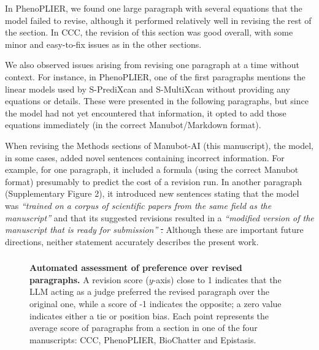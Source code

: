 \documentclass[
]{article}
\providecommand{\DIFaddtex}[1]{{\protect\color{blue}\uwave{#1}}} %
\providecommand{\DIFdeltex}[1]{{\protect\color{red}\sout{#1}}}                      %
\providecommand{\DIFaddbegin}{} %
\providecommand{\DIFaddend}{} %
\providecommand{\DIFdelbegin}{} %
\providecommand{\DIFdelend}{} %
\providecommand{\DIFadd}[1]{\texorpdfstring{\DIFaddtex{#1}}{#1}} %
\providecommand{\DIFdel}[1]{\texorpdfstring{\DIFdeltex{#1}}{}} %
\newcommand{\DIFscaledelfig}{0.5}
\newlength{\DIFdelgraphicswidth} %
\newlength{\DIFdelgraphicsheight} %
\newcommand{\DIFaddincludegraphics}[2][]{{\color{blue}\fbox{\DIFOincludegraphics[#1]{#2}}}} %
\newcommand{\DIFdelincludegraphics}[2][]{%
\sbox{\DIFdelgraphicsbox}{\DIFOincludegraphics[#1]{#2}}%
\settoboxwidth{\DIFdelgraphicswidth}{\DIFdelgraphicsbox} %
\settoboxtotalheight{\DIFdelgraphicsheight}{\DIFdelgraphicsbox} %
\scalebox{\DIFscaledelfig}{%
\parbox[b]{\DIFdelgraphicswidth}{\usebox{\DIFdelgraphicsbox}\\[-\baselineskip] \rule{\DIFdelgraphicswidth}{0em}}\llap{\resizebox{\DIFdelgraphicswidth}{\DIFdelgraphicsheight}{%
\setlength{\unitlength}{\DIFdelgraphicswidth}%
\begin{picture}(1,1)%
\thicklines\linethickness{2pt} %
{\color[rgb]{1,0,0}\put(0,0){\framebox(1,1){}}}%
{\color[rgb]{1,0,0}\put(0,0){\line( 1,1){1}}}%
{\color[rgb]{1,0,0}\put(0,1){\line(1,-1){1}}}%
\end{picture}%
}\hspace*{3pt}}} %
} %
\DeclareRobustCommand{\DIFaddbegin}{\DIFOaddbegin \let\includegraphics\DIFaddincludegraphics} %
\DeclareRobustCommand{\DIFaddend}{\DIFOaddend \let\includegraphics\DIFOincludegraphics} %
\DeclareRobustCommand{\DIFdelbegin}{\DIFOdelbegin \let\includegraphics\DIFdelincludegraphics} %
\DeclareRobustCommand{\DIFdelend}{\DIFOaddend \let\includegraphics\DIFOincludegraphics} %
\begin{document}
In PhenoPLIER, we found one large paragraph with several equations that the model failed to revise, although it performed relatively well in revising the rest of the section.
In CCC, the revision of this section was good overall, with some minor and easy-to-fix issues as in the other sections.

We also observed issues arising from revising one paragraph at a time without context.
For instance, in PhenoPLIER, one of the first paragraphs mentions the linear models used by S-PrediXcan and S-MultiXcan without providing any equations or details.
These were presented in the following paragraphs, but since the model had not yet encountered that information, it opted to add those equations immediately (in the correct Manubot/Markdown format).

% 

When revising the Methods sections of Manubot-AI (this manuscript), the model, in some cases, added novel sentences containing incorrect information.
For example, for one paragraph, it included a formula (using the correct Manubot format) presumably to predict the cost of a revision run.
In another paragraph (Supplementary Figure 2), it introduced new sentences stating that the model was \emph{``trained on a corpus of scientific papers from the same field as the manuscript''} and that its suggested revisions resulted in a \emph{``modified version of the manuscript that is ready for submission\DIFaddbegin \DIFadd{.}\DIFaddend ''}
\DIFdelbegin \DIFdel{.
}\DIFdelend Although these are important future directions, neither statement accurately describes the present work.

\DIFaddbegin \subsubsection{\DIFadd{Automated assessments}}

\begin{figure}
\hypertarget{fig:llm_judge}{%
\centering

\caption{\textbf{Automated assessment of preference over revised paragraphs.}
A revision score (\(y\)-axis) close to 1 indicates that the LLM acting as a judge preferred the revised paragraph over the original one, while a score of -1 indicates the opposite; a zero value indicates either a tie or position bias.
Each point represents the average score of paragraphs from a section in one of the four manuscripts: CCC, PhenoPLIER, BioChatter and Epistasis.}\label{fig:llm_judge}
}
\end{figure}
\end{document}
